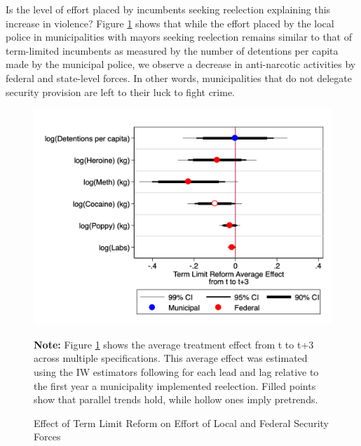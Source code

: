 \documentclass[12pt]{amsart}
\makeatletter
\def\section{\@startsection{section}{1}
	\z@{1.0\linespacing\@plus\linespacing}{.5\linespacing}{\Large}}
\numberwithin{equation}{section}
\theoremstyle{definition}
\theoremstyle{definition}
\theoremstyle{definition}
\makeatother
\begin{document}
Is the level of effort placed by incumbents seeking reelection explaining this increase in violence? Figure \ref{fig:effort} shows that while the effort placed by the local police in municipalities with mayors seeking reelection remains similar to that of term-limited incumbents as measured by the number of detentions per capita made by the municipal police, we observe a decrease in anti-narcotic activities by federal and state-level forces. In other words, municipalities that do not delegate security provision are left to their luck to fight crime. 

\begin{figure}[H]  
\centering
\caption{Effect of Term Limit Reform on Effort of Local and Federal Security Forces} 
\label{fig:effort}

   
\includegraphics[width=1\textwidth]{../Figures/effort.png}
  
 \textbf{Note:} Figure \ref{fig:effort} shows the average treatment effect from t to t+3 across multiple specifications. This average effect was estimated using the IW estimators following \citet{abraham_sun_2020} for each lead and lag relative to the first year a municipality implemented reelection. Filled points show that parallel trends hold, while hollow ones imply pretrends.        
\end{figure} 

 
\section{Conclusion \label{sec:conclusion}}
\end{document}
